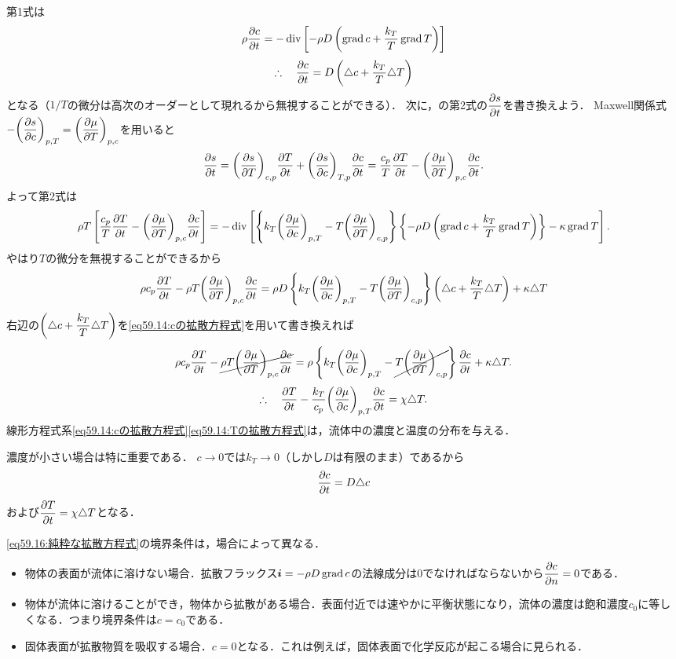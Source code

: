 第1式は
\[
    \rho\pdv{c}{t} = - \operatorname{div} \left[ -\rho D \left( \operatorname{grad} c + \frac{k_T}{T} \operatorname{grad} T \right) \right]
\]
\begin{equation}\label{eq59.14:cの拡散方程式}
    \therefore\quad \pdv{c}{t} = D \left( \triangle c + \frac{k_T}{T} \triangle T \right)
\end{equation}
となる（$1/T$の微分は高次のオーダーとして現れるから無視することができる）．
次に，の第2式の$\dpdv{s}{t}$を書き換えよう．
Maxwell関係式$-\dPDV{s}{c}{p,T} = \dPDV{\mu}{T}{p,c}$を用いると
\[
    \pdv{s}{t} = \PDV{s}{T}{c,p} \pdv{T}{t} + \PDV{s}{c}{T,p} \pdv{c}{t}
    = \frac{c_p}{T} \pdv{T}{t} - \PDV{\mu}{T}{p,c} \pdv{c}{t} .
\]
よって第2式は
\[
    \rho T \left[ \frac{c_p}{T} \pdv{T}{t} - \PDV{\mu}{T}{p,c} \pdv{c}{t} \right]
    = -\Div \left[ \left\{ k_T \PDV{\mu}{c}{p,T} - T \PDV{\mu}{T}{c,p} \right\}
    \left\{ -\rho D \left( \Grad c + \frac{k_T}{T} \Grad T \right) \right\} - \kappa \Grad T \right] .
\]
やはり$T$の微分を無視することができるから
\[
    \rho c_p \pdv{T}{t} - \rho T \PDV{\mu}{T}{p,c} \pdv{c}{t}
    = \rho D \left\{ k_T \PDV{\mu}{c}{p,T} - T \PDV{\mu}{T}{c,p} \right\}
    \left( \Laplacian c + \frac{k_T}{T} \Laplacian T \right) + \kappa \Laplacian T 
\]
右辺の$\left( \triangle c + \dfrac{k_T}{T} \triangle T \right)$を\eqref{eq59.14:cの拡散方程式}を用いて書き換えれば
\[
    \rho c_p \pdv{T}{t} - \cancel{ \rho T \PDV{\mu}{T}{p,c} \pdv{c}{t} }
    = \rho \left\{ k_T \PDV{\mu}{c}{p,T} - \cancel{ T \PDV{\mu}{T}{c,p} } \right\} \pdv{c}{t}  + \kappa \Laplacian T .
\]
\begin{equation}\label{eq59.14:Tの拡散方程式}
    \yueni \pdv{T}{t} - \frac{k_T}{c_p} \PDV{\mu}{c}{p,T} \pdv{c}{t} = \chi \Laplacian T .
\end{equation}
線形方程式系\eqref{eq59.14:cの拡散方程式}\eqref{eq59.14:Tの拡散方程式}は，流体中の濃度と温度の分布を与える．



濃度が小さい場合は特に重要である．
$c \to 0$では$k_T \to 0$（しかし$D$は有限のまま）であるから
\begin{equation}\label{eq59.16:純粋な拡散方程式}
    \pdv{c}{t} = D \triangle c
\end{equation}
および$\dpdv{T}{t} = \chi \Laplacian T$となる．


\eqref{eq59.16:純粋な拡散方程式}の境界条件は，場合によって異なる．
\begin{itemize}
    \item 物体の表面が流体に溶けない場合．拡散フラックス$\vb*{i} = -\rho D \operatorname{grad} c$の法線成分は0でなければならないから$\dpdv{c}{n}=0$である．
    \item 物体が流体に溶けることができ，物体から拡散がある場合．表面付近では速やかに平衡状態になり，流体の濃度は飽和濃度$c_0$に等しくなる．つまり境界条件は$c=c_0$である．
    \item 固体表面が拡散物質を吸収する場合．$c=0$となる．これは例えば，固体表面で化学反応が起こる場合に見られる．
\end{itemize}



